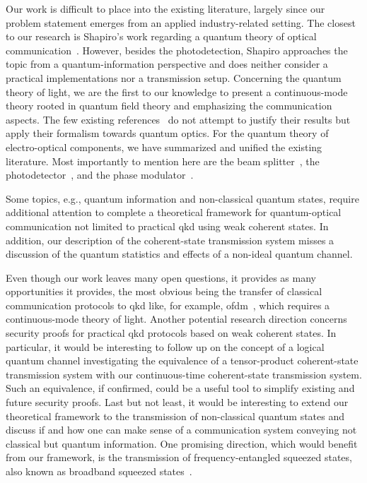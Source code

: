 Our work is difficult to place into the existing literature, largely since our problem statement emerges from an applied industry-related setting.
The closest to our research is Shapiro's work regarding a quantum theory of optical communication~\cite{Shapiro2009}.
However, besides the photodetection, Shapiro approaches the topic from a quantum-information perspective and does neither consider a practical implementations nor a transmission setup.
Concerning the quantum theory of light, we are the first to our knowledge to present a continuous-mode theory rooted in quantum field theory and emphasizing the communication aspects.
The few existing references~\cite{Barnett2002,Loudon2000} do not attempt to justify their results but apply their formalism towards quantum optics.
For the quantum theory of electro-optical components, we have summarized and unified the existing literature.
Most importantly to mention here are the beam splitter~\cite{Haroche2006,Leonhardt2003,Vogel2006}, the photodetector~\cite{Vogel2006,Mandel1995,Shapiro2009}, and the phase modulator~\cite{Horoshko2018,QuesadaMejia2015}.

Some topics, e.g., quantum information and non-classical quantum states, require additional attention to complete a theoretical framework for quantum-optical communication not limited to practical \gls{qkd} using weak coherent states.
In addition, our description of the coherent-state transmission system misses a discussion of the quantum statistics and effects of a non-ideal quantum channel.

Even though our work leaves many open questions, it provides as many opportunities it provides, the most obvious being the transfer of classical communication protocols to \gls{qkd} like, for example, \gls{ofdm}~\cite{Bahrani2015}, which requires a continuous-mode theory of light.
Another potential research direction concerns security proofs for practical \gls{qkd} protocols based on weak coherent states.
In particular, it would be interesting to follow up on the concept of a logical quantum channel investigating the equivalence of a tensor-product coherent-state transmission system with our continuous-time coherent-state transmission system.
Such an equivalence, if confirmed, could be a useful tool to simplify existing and future security proofs.
Last but not least, it would be interesting to extend our theoretical framework to the transmission of non-classical quantum states and discuss if and how one can make sense of a communication system conveying not classical but quantum information.
One promising direction, which would benefit from our framework, is the transmission of frequency-entangled squeezed states, also known as broadband squeezed states~\cite{Vogel2006,Mandel1995}.